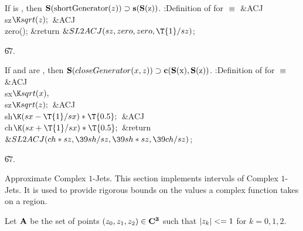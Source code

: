 If  is , then
$\reps{\PB{\\{shortGenerator}(\|z)}}   \supset\shortGen{\reps{z}}$.
\endproposition
\Y\B\4:Definition of  for \X${}%
\E{}$\6
\&{ACJ} \\{sz}${}\K\\{sqrt}(\|z);{}$\6
\&{ACJ} \\{zero}();\7
\&{return} ${}\&{SL2ACJ}(\\{sz},\39\\{zero},\39\\{zero},\39\T{1}/\\{sz}){}$;\par
\U67.\fi

If  and  are , then
$\reps{\PB{$\\{closeGenerator}(\|x,\|z)$}} \supset\closeGen{\reps{x}}{%
\reps{z}}$.
\endproposition
\Y\B\4:Definition of  for \X${}\equiv{}$\6
\&{ACJ} \\{sx}${}\K\\{sqrt}(\|x),{}$ \\{sz}${}\K\\{sqrt}(\|z);{}$\6
\&{ACJ} \\{sh}${}\K(\\{sx}-\T{1}/\\{sx})*\T{0.5};{}$\6
\&{ACJ} \\{ch}${}\K(\\{sx}+\T{1}/\\{sx})*\T{0.5};{}$\7
\&{return} ${}\&{SL2ACJ}(\\{ch}*\\{sz},\39\\{sh}/\\{sz},\39\\{sh}*\\{sz},\39%
\\{ch}/\\{sz}){}$;\par
\U67.\fi

Approximate Complex $1$-Jets.
This section implements intervals of Complex $1$-Jets.
It is used to provide rigorous bounds
on the values a complex function takes on a region.

Let $\bf A$ be the set of points $(z_0, z_1, z_2) \in \bf C^3$
such that $|{z_k}| <= 1$ for $k = 0,1,2$.

